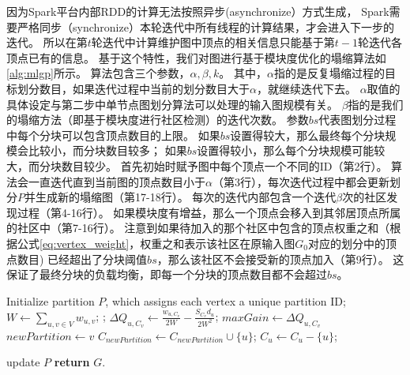 \documentclass[master]{njuthesis}
\begin{document}
因为Spark平台内部RDD的计算无法按照异步(asynchronize）方式生成，
Spark需要严格同步（synchronize）本轮迭代中所有线程的计算结果，才会进入下一步的迭代。
所以在第$t$轮迭代中计算维护图中顶点的相关信息只能基于第$t-1$轮迭代各顶点已有的信息。
基于这个特性，我们对图进行基于模块度优化的塌缩算法如\ref{alg:mlgp}所示。
算法包含三个参数，$\alpha, \beta, k$。
其中，$\alpha$指的是反复塌缩过程的目标划分数目，如果迭代过程中当前的划分数目大于$\alpha$，就继续迭代下去。
$\alpha$取值的具体设定与第二步中单节点图划分算法可以处理的输入图规模有关。
$\beta$指的是我们的塌缩方法（即基于模块度进行社区检测）的迭代次数。
参数$bs$代表图划分过程中每个分块可以包含顶点数目的上限。
如果$bs$设置得较大，那么最终每个分块规模会比较小，而分块数目较多；
如果$bs$设置得较小，那么每个分块规模可能较大，而分块数目较少。
首先初始时赋予图中每个顶点一个不同的ID（第2行）。
算法会一直迭代直到当前图的顶点数目小于$\alpha$（第3行），每次迭代过程中都会更新划分$P$并生成新的塌缩图（第17-18行）。
每次的迭代内部包含一个迭代$\beta$次的社区发现过程（第4-16行）。
如果模块度有增益，那么一个顶点会移入到其邻居顶点所属的社区中（第7-16行）。
注意到如果待加入的那个社区中包含的顶点权重之和（根据公式\ref{eq:vertex_weight}，权重之和表示该社区在原输入图$G_0$对应的划分中的顶点数目)
已经超出了分块阈值$bs$，那么该社区不会接受新的顶点加入（第9行）。
这保证了最终分块的负载均衡，即每一个分块的顶点数目都不会超过$bs$。

\begin{algorithm}[h]
\label{alg:mlgp}
\begin{algorithmic}[1]
  \State Initialize partition $P$, which assigns each vertex a unique partition ID;
       
	  \State $W \gets \sum\nolimits_{u,v \in V} w_{u,v}$; 
		;
		  
		   
		     \State $\Delta Q_{u,C_{v}} \gets \frac{w_{u,C_v}}{2W} - \frac{S_{C_v}d_u}{2W^2}$;
		      \State $maxGain \gets \Delta Q_{u,C_{v}}$
		      \State $newPartition \gets v$
		     \EndIf
		   \EndIf
		\EndFor
		    \State $C_{newPartition} \gets C_{newPartition}\cup\{u\}$;
		    \State $C_{u} \gets C_{u} - \{u\}$;
		    
		\EndIf	
	    \EndFor
	  \EndFor
	  \State update $P$
	\EndWhile
\State \textbf{return} $G$.
\EndProcedure
\end{algorithmic}
\end{algorithm}
\end{document}
